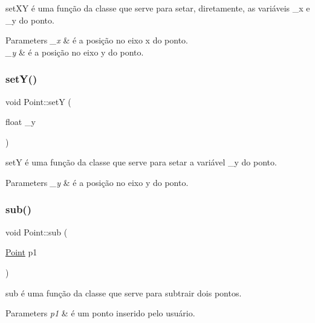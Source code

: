 set\+XY é uma função da classe que serve para setar, diretamente, as variáveis \+\_\+x e \+\_\+y do ponto. 


\begin{DoxyParams}{Parameters}
{\em \+\_\+x} & é a posição no eixo x do ponto. \\
\hline
{\em \+\_\+y} & é a posição no eixo y do ponto. \\
\hline
\end{DoxyParams}
\mbox{\label{class_point_a9868c4601b0ea0c2d0de20fe41ee0e49}} 
\subsubsection{\texorpdfstring{set\+Y()}{setY()}}
{\footnotesize\ttfamily void Point\+::setY (\begin{DoxyParamCaption}\item[{float}]{\+\_\+y }\end{DoxyParamCaption})}



setY é uma função da classe que serve para setar a variável \+\_\+y do ponto. 


\begin{DoxyParams}{Parameters}
{\em \+\_\+y} & é a posição no eixo y do ponto. \\
\hline
\end{DoxyParams}
\mbox{\label{class_point_af7d9e533f0030edf4ab28fdc0f12acd4}} 
\subsubsection{\texorpdfstring{sub()}{sub()}}
{\footnotesize\ttfamily void Point\+::sub (\begin{DoxyParamCaption}\item[{\mbox{\hyperlink{class_point}{Point}}}]{p1 }\end{DoxyParamCaption})}



sub é uma função da classe que serve para subtrair dois pontos. 


\begin{DoxyParams}{Parameters}
{\em p1} & é um ponto inserido pelo usuário. \\
\hline
\end{DoxyParams}
\mbox{\label{class_point_ad9676e36f3444534b609e3c68422239a}} 
